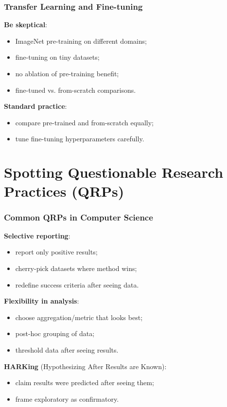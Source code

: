 \documentclass[]{beamer}
\begin{document}
\begin{frame}[fragile]
\frametitle{Transfer Learning and Fine-tuning}
\textbf{Be skeptical}:
\begin{itemize}
  \item ImageNet pre-training on different domains;
  \item fine-tuning on tiny datasets;
  \item no ablation of pre-training benefit;
  \item fine-tuned vs. from-scratch comparisons.
\end{itemize}

\textbf{Standard practice}:
\begin{itemize}
  \item compare pre-trained and from-scratch equally;
  \item tune fine-tuning hyperparameters carefully.
\end{itemize}

\end{frame}

\section{Spotting Questionable Research Practices (QRPs)}

\begin{frame}[fragile]
\frametitle{Common QRPs in Computer Science}
\textbf{Selective reporting}:
\begin{itemize}
  \item report only positive results;
  \item cherry-pick datasets where method wins;
  \item redefine success criteria after seeing data.
\end{itemize}

\textbf{Flexibility in analysis}:
\begin{itemize}
  \item choose aggregation/metric that looks best;
  \item post-hoc grouping of data;
  \item threshold data after seeing results.
\end{itemize}

\textbf{HARKing} (Hypothesizing After Results are Known):
\begin{itemize}
  \item claim results were predicted after seeing them;
  \item frame exploratory as confirmatory.
\end{itemize}

\end{frame}
\end{document}
